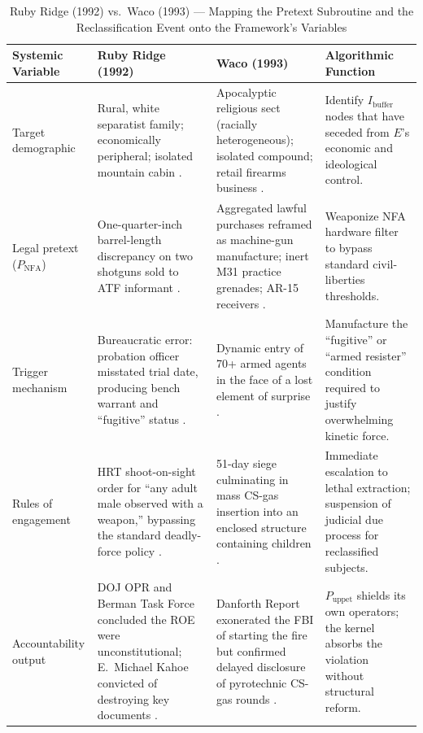 \begin{table}[htbp]
\centering
\small
\caption{Ruby Ridge (1992) vs.\ Waco (1993) --- Mapping the Pretext Subroutine and the Reclassification Event onto the Framework's Variables}
\label{tab:ruby_waco_mapping}
\begin{tabular}{>{\raggedright}p{3.2cm} >{\raggedright}p{4.5cm} >{\raggedright}p{4.5cm} >{\raggedright\arraybackslash}p{3.5cm}}
\toprule
\textbf{Systemic Variable} & \textbf{Ruby Ridge (1992)} & \textbf{Waco (1993)} & \textbf{Algorithmic Function} \\
\midrule
Target demographic & Rural, white separatist family; economically peripheral; isolated mountain cabin \cite{dojruby1994}. & Apocalyptic religious sect (racially heterogeneous); isolated compound; retail firearms business \cite{treasury1993waco}. & Identify $I_{\text{buffer}}$ nodes that have seceded from $E$'s economic and ideological control. \\
Legal pretext ($P_{\text{NFA}}$) & One-quarter-inch barrel-length discrepancy on two shotguns sold to ATF informant \cite{dojruby1994}. & Aggregated lawful purchases reframed as machine-gun manufacture; inert M31 practice grenades; AR-15 receivers \cite{treasury1993waco}. & Weaponize NFA hardware filter to bypass standard civil-liberties thresholds. \\
Trigger mechanism & Bureaucratic error: probation officer misstated trial date, producing bench warrant and ``fugitive'' status \cite{oprruby2001}. & Dynamic entry of 70+ armed agents in the face of a lost element of surprise \cite{treasury1993waco}. & Manufacture the ``fugitive'' or ``armed resister'' condition required to justify overwhelming kinetic force. \\
Rules of engagement & HRT shoot-on-sight order for ``any adult male observed with a weapon,'' bypassing the standard deadly-force policy \cite{dojruby1994, oprruby2001}. & 51-day siege culminating in mass CS-gas insertion into an enclosed structure containing children \cite{danforth2000}. & Immediate escalation to lethal extraction; suspension of judicial due process for reclassified subjects. \\
Accountability output & DOJ OPR and Berman Task Force concluded the ROE were unconstitutional; E.\ Michael Kahoe convicted of destroying key documents \cite{dojruby1994, oprruby2001}. & Danforth Report exonerated the FBI of starting the fire but confirmed delayed disclosure of pyrotechnic CS-gas rounds \cite{danforth2000}. & $P_{\text{uppet}}$ shields its own operators; the kernel absorbs the violation without structural reform. \\
\bottomrule
\end{tabular}
\end{table}


